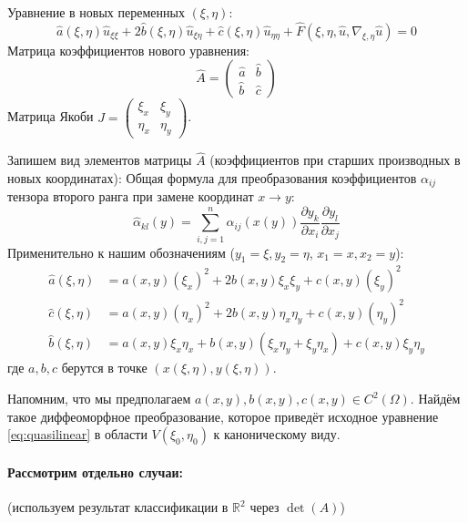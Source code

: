 \documentclass[12pt, a4paper]{article}
\begin{document}
Уравнение в новых переменных $(\xi, \eta)$:
\[
\hat{a}(\xi,\eta) \hat{u}_{\xi\xi} + 2\hat{b}(\xi,\eta) \hat{u}_{\xi\eta} + \hat{c}(\xi,\eta) \hat{u}_{\eta\eta} + \hat{F}(\xi, \eta, \hat{u}, \nabla_{\xi,\eta} \hat{u}) = 0
\]
Матрица коэффициентов нового уравнения:
\[
\hat{A} = \begin{pmatrix} \hat{a} & \hat{b} \\ \hat{b} & \hat{c} \end{pmatrix}
\]
Матрица Якоби $J = \begin{pmatrix} \xi_x & \xi_y \\ \eta_x & \eta_y \end{pmatrix}$.

Запишем вид элементов матрицы $\hat{A}$ (коэффициентов при старших производных в новых координатах):
Общая формула для преобразования коэффициентов $\alpha_{ij}$ тензора второго ранга при замене координат $x \to y$:
\[ \hat{\alpha}_{kl}(y) = \sum_{i,j=1}^n \alpha_{ij}(x(y)) \frac{\partial y_k}{\partial x_i} \frac{\partial y_l}{\partial x_j} \]
Применительно к нашим обозначениям ($y_1=\xi, y_2=\eta$, $x_1=x, x_2=y$):
\begin{align*}
\hat{a}(\xi,\eta) &= a(x,y) (\xi_x)^2 + 2b(x,y) \xi_x \xi_y + c(x,y) (\xi_y)^2 \\
\hat{c}(\xi,\eta) &= a(x,y) (\eta_x)^2 + 2b(x,y) \eta_x \eta_y + c(x,y) (\eta_y)^2 \\
\hat{b}(\xi,\eta) &= a(x,y) \xi_x \eta_x + b(x,y) (\xi_x \eta_y + \xi_y \eta_x) + c(x,y) \xi_y \eta_y
\end{align*}
где $a, b, c$ берутся в точке $(x(\xi,\eta), y(\xi,\eta))$.

Напомним, что мы предполагаем $a(x,y), b(x,y), c(x,y) \in C^2(\Omega)$. Найдём такое диффеоморфное преобразование, которое приведёт исходное уравнение \eqref{eq:quasilinear} в области $V(\xi_0, \eta_0)$ к каноническому виду.

\paragraph{Рассмотрим отдельно случаи:} (используем результат классификации в $\mathbb{R}^2$ через $\det(A)$)
\end{document}
